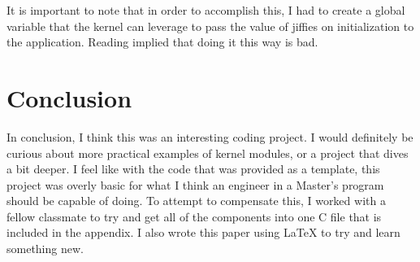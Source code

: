 \documentclass[10pt]{article}
\begin{document}
It is important to note that in order to accomplish this, I had to create a global variable that the kernel can leverage to pass the value of jiffies on initialization to the application.  Reading implied that doing it this way is bad.

\section{Conclusion}
In conclusion, I think this was an interesting coding project.  I would definitely be curious about more practical examples of kernel modules, or a project that dives a bit deeper.  I feel like with the code that was provided as a template, this project was overly basic for what I think an engineer in a Master's program should be capable of doing.  To attempt to compensate this, I worked with a fellow classmate to try and get all of the components into one C file that is included in the appendix.  I also wrote this paper using LaTeX to try and learn something new.

\pagebreak
\end{document}
